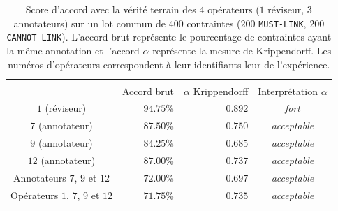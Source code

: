 			\begin{table}[!htb]
				\begin{center}
				\begin{tabular}{|c|r|r|c|}
				
					\hline
					\rowcolor{colorTableHeader!15}
						& \multicolumn{3}{c|}{
							\shortstack{Accord avec la vérité terrain}
						}
						\tabularnewline
						\hhline{|~|---|}
					\rowcolor{colorTableHeader!15}
					\multirow{-2}{*}{Opérateurs}
						& Accord brut
						& $\alpha$ Krippendorff
						& Interprétation $\alpha$
						\tabularnewline
						\hline \hline
					$1$ (réviseur)
						& $94.75$\%
						& $0.892$
						& \textit{fort}
						\tabularnewline
						\hline
					$7$ (annotateur)
						& $87.50$\%
						& $0.750$
						& \textit{acceptable}
						\tabularnewline
						\hline
					$9$ (annotateur)
						& $84.25$\%
						& $0.685$
						& \textit{acceptable}
						\tabularnewline
						\hline
					$12$ (annotateur)
						& $87.00$\%
						& $0.737$
						& \textit{acceptable}
						\tabularnewline
						\hline
					Annotateurs $7$, $9$ et $12$
						& $72.00$\%
						& $0.697$
						& \textit{acceptable}
						\tabularnewline
						\hline
					Opérateurs $1$, $7$, $9$ et $12$
						& $71.75$\%
						& $0.735$
						& \textit{acceptable}
						\tabularnewline
						\hline
				\end{tabular}
				\end{center}
				\caption{
					Score d'accord avec la vérité terrain des $4$ opérateurs ($1$ réviseur, $3$ annotateurs) sur un lot commun de $400$ contraintes ($200$ \texttt{MUST-LINK}, $200$ \texttt{CANNOT-LINK}).
					L'accord brut représente le pourcentage de contraintes ayant la même annotation et l'accord $\alpha$ représente la mesure de Krippendorff.
					Les numéros d'opérateurs correspondent à leur identifiants leur de l'expérience.
				}
				\label{table:4.6.1-ETUDE-ROBUSTESSE-SCORE-ACCORD-VERITE-TERRAIN}
			\end{table}
			
